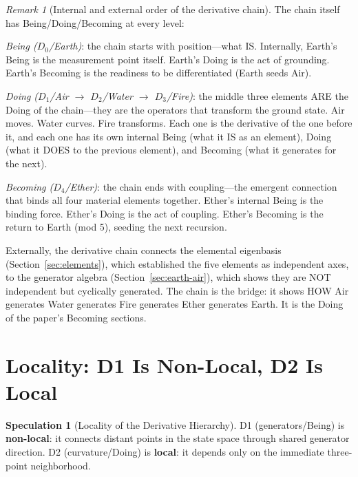 \documentclass[11pt]{article}
\theoremstyle{definition}
\newtheorem{speculation}[theorem]{Speculation}
\theoremstyle{remark}
\newtheorem{remark}[theorem]{Remark}
\begin{document}
\begin{remark}[Internal and external order of the derivative chain]
The chain itself has Being/Doing/Becoming at every level:

\emph{Being ($D_0$/Earth)}: the chain starts with position---what IS.
Internally, Earth's Being is the measurement point itself.  Earth's Doing
is the act of grounding.  Earth's Becoming is the readiness to be
differentiated (Earth seeds Air).

\emph{Doing ($D_1$/Air $\to$ $D_2$/Water $\to$ $D_3$/Fire)}: the middle
three elements ARE the Doing of the chain---they are the operators that
transform the ground state.  Air moves.  Water curves.  Fire transforms.
Each one is the derivative of the one before it, and each one has its own
internal Being (what it IS as an element), Doing (what it DOES to
the previous element), and Becoming (what it generates for the next).

\emph{Becoming ($D_4$/Ether)}: the chain ends with coupling---the
emergent connection that binds all four material elements together.
Ether's internal Being is the binding force.  Ether's Doing is the act
of coupling.  Ether's Becoming is the return to Earth (mod 5), seeding
the next recursion.

Externally, the derivative chain connects the elemental eigenbasis
(Section~\ref{sec:elements}), which established the five elements as
independent axes, to the generator algebra (Section~\ref{sec:earth-air}),
which shows they are NOT independent but cyclically generated.  The chain
is the bridge: it shows HOW Air generates Water generates Fire generates
Ether generates Earth.  It is the Doing of the paper's Becoming sections.
\end{remark}

\section{Locality: D1 Is Non-Local, D2 Is Local}
\label{sec:locality}

\begin{speculation}[Locality of the Derivative Hierarchy]
\label{spec:locality}
D1 (generators/Being) is \textbf{non-local}: it connects distant points in the
state space through shared generator direction.  D2 (curvature/Doing) is
\textbf{local}: it depends only on the immediate three-point neighborhood.
\end{speculation}
\end{document}
